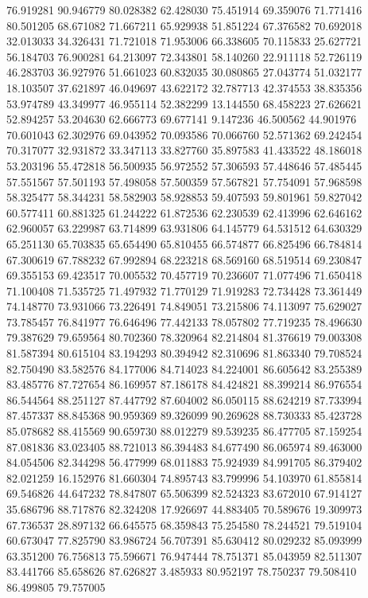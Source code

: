 76.919281
90.946779
80.028382
62.428030
75.451914
69.359076
71.771416
80.501205
68.671082
71.667211
65.929938
51.851224
67.376582
70.692018
32.013033
34.326431
71.721018
71.953006
66.338605
70.115833
25.627721
56.184703
76.900281
64.213097
72.343801
58.140260
22.911118
52.726119
46.283703
36.927976
51.661023
60.832035
30.080865
27.043774
51.032177
18.103507
37.621897
46.049697
43.622172
32.787713
42.374553
38.835356
53.974789
43.349977
46.955114
52.382299
13.144550
68.458223
27.626621
52.894257
53.204630
62.666773
69.677141
9.147236
46.500562
44.901976
70.601043
62.302976
69.043952
70.093586
70.066760
52.571362
69.242454
70.317077
32.931872
33.347113
33.827760
35.897583
41.433522
48.186018
53.203196
55.472818
56.500935
56.972552
57.306593
57.448646
57.485445
57.551567
57.501193
57.498058
57.500359
57.567821
57.754091
57.968598
58.325477
58.344231
58.582903
58.928853
59.407593
59.801961
59.827042
60.577411
60.881325
61.244222
61.872536
62.230539
62.413996
62.646162
62.960057
63.229987
63.714899
63.931806
64.145779
64.531512
64.630329
65.251130
65.703835
65.654490
65.810455
66.574877
66.825496
66.784814
67.300619
67.788232
67.992894
68.223218
68.569160
68.519514
69.230847
69.355153
69.423517
70.005532
70.457719
70.236607
71.077496
71.650418
71.100408
71.535725
71.497932
71.770129
71.919283
72.734428
73.361449
74.148770
73.931066
73.226491
74.849051
73.215806
74.113097
75.629027
73.785457
76.841977
76.646496
77.442133
78.057802
77.719235
78.496630
79.387629
79.659564
80.702360
78.320964
82.214804
81.376619
79.003308
81.587394
80.615104
83.194293
80.394942
82.310696
81.863340
79.708524
82.750490
83.582576
84.177006
84.714023
84.224001
86.605642
83.255389
83.485776
87.727654
86.169957
87.186178
84.424821
88.399214
86.976554
86.544564
88.251127
87.447792
87.604002
86.050115
88.624219
87.733994
87.457337
88.845368
90.959369
89.326099
90.269628
88.730333
85.423728
85.078682
88.415569
90.659730
88.012279
89.539235
86.477705
87.159254
87.081836
83.023405
88.721013
86.394483
84.677490
86.065974
89.463000
84.054506
82.344298
56.477999
68.011883
75.924939
84.991705
86.379402
82.021259
16.152976
81.660304
74.895743
83.799996
54.103970
61.855814
69.546826
44.647232
78.847807
65.506399
82.524323
83.672010
67.914127
35.686796
88.717876
82.324208
17.926697
44.883405
70.589676
19.309973
67.736537
28.897132
66.645575
68.359843
75.254580
78.244521
79.519104
60.673047
77.825790
83.986724
56.707391
85.630412
80.029232
85.093999
63.351200
76.756813
75.596671
76.947444
78.751371
85.043959
82.511307
83.441766
85.658626
87.626827
3.485933
80.952197
78.750237
79.508410
86.499805
79.757005
